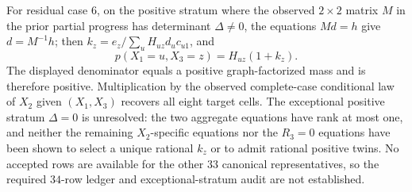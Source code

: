 For residual case \(6\), on the positive stratum where the observed \(2\times2\) matrix \(M\) in the prior partial progress has determinant \(\Delta\neq0\), the equations \(Md=h\) give \(d=M^{-1}h\); then \(k_z=e_z/\sum_uH_{uz}d_uc_{u1}\), and
\[
p(X_1=u,X_3=z)=H_{uz}(1+k_z).
\]
The displayed denominator equals a positive graph-factorized mass and is therefore positive. Multiplication by the observed complete-case conditional law of \(X_2\) given \((X_1,X_3)\) recovers all eight target cells. The exceptional positive stratum \(\Delta=0\) is unresolved: the two aggregate equations have rank at most one, and neither the remaining \(X_2\)-specific equations nor the \(R_3=0\) equations have been shown to select a unique rational \(k_z\) or to admit rational positive twins. No accepted rows are available for the other \(33\) canonical representatives, so the required \(34\)-row ledger and exceptional-stratum audit are not established.